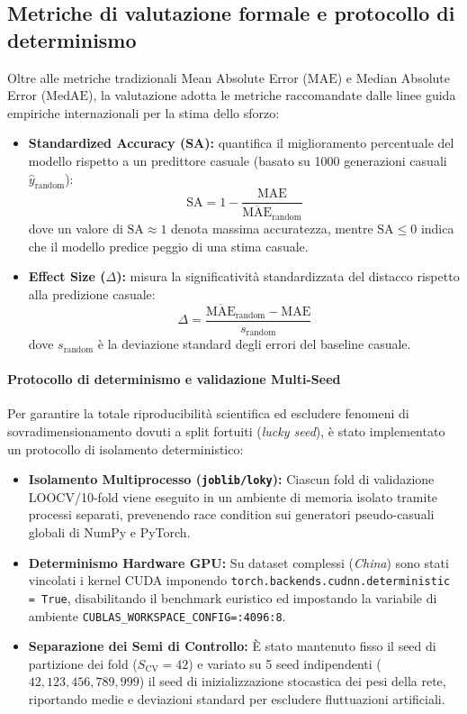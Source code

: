 \documentclass[11pt, a4paper]{article}
\begin{document}
\subsection{Metriche di valutazione formale e protocollo di determinismo}
Oltre alle metriche tradizionali Mean Absolute Error ($\text{MAE}$) e Median
Absolute Error ($\text{MedAE}$), la valutazione adotta le metriche raccomandate
dalle linee guida empiriche internazionali per la stima dello sforzo:
\begin{itemize}
    \item \textbf{Standardized Accuracy (SA):} quantifica il miglioramento percentuale del modello rispetto a un predittore casuale (basato su 1000 generazioni casuali $\hat{y}_{\text{random}}$):
          \begin{equation}
              \text{SA} = 1 - \frac{\text{MAE}}{\overline{\text{MAE}}_{\text{random}}}
          \end{equation}
          dove un valore di $\text{SA} \approx 1$ denota massima accuratezza, mentre $\text{SA} \le 0$ indica che il modello predice peggio di una stima casuale.
    \item \textbf{Effect Size ($\Delta$):} misura la significatività standardizzata del distacco rispetto alla predizione casuale:
          \begin{equation}
              \Delta = \frac{\overline{\text{MAE}}_{\text{random}} - \text{MAE}}{s_{\text{random}}}
          \end{equation}
          dove $s_{\text{random}}$ è la deviazione standard degli errori del baseline casuale.
\end{itemize}

\paragraph{Protocollo di determinismo e validazione Multi-Seed}
Per garantire la totale riproducibilità scientifica ed escludere fenomeni di
sovradimensionamento dovuti a split fortuiti (\textit{lucky seed}), è stato
implementato un protocollo di isolamento deterministico:
\begin{itemize}
    \item \textbf{Isolamento Multiprocesso (\texttt{joblib/loky}):} Ciascun fold di validazione LOOCV/10-fold viene eseguito in un ambiente di memoria isolato tramite processi separati, prevenendo race condition sui generatori pseudo-casuali globali di NumPy e PyTorch.
    \item \textbf{Determinismo Hardware GPU:} Su dataset complessi (\textit{China}) sono stati vincolati i kernel CUDA imponendo \texttt{torch.backends.cudnn.deterministic = True}, disabilitando il benchmark euristico ed impostando la variabile di ambiente \texttt{CUBLAS\_WORKSPACE\_CONFIG=:4096:8}.
    \item \textbf{Separazione dei Semi di Controllo:} È stato mantenuto fisso il seed di partizione dei fold ($S_{\text{CV}} = 42$) e variato su 5 seed indipendenti ($42, 123, 456, 789, 999$) il seed di inizializzazione stocastica dei pesi della rete, riportando medie e deviazioni standard per escludere fluttuazioni artificiali.
\end{itemize}
\end{document}
